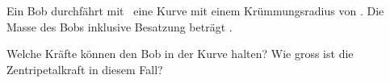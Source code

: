 Ein Bob durchfährt mit \vBoO\ eine Kurve mit einem Krümmungsradius von \rBoO. Die Masse des Bobs inklusive Besatzung beträgt \mBoO.

\begin{abcliste}
\abc Welche Kräfte können den Bob in der Kurve halten?
\abc Wie gross ist die Zentripetalkraft in diesem Fall?
\end{abcliste}
